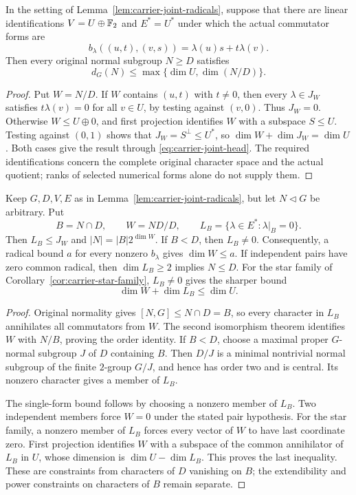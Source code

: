 \begin{corollary}\label{cor:carrier-star-family}
In the setting of Lemma~\ref{lem:carrier-joint-radicals}, suppose that
there are linear identifications $V=U\oplus\mathbb F_2$ and $E^*=U^*$ under
which the actual commutator forms are
\[
 b_\lambda((u,t),(v,s))=\lambda(u)s+t\lambda(v).
\]
Then every original normal subgroup $N\geq D$ satisfies
\[
 d_G(N)\leq\max\{\dim U,\dim(N/D)\}.
\]
\end{corollary}
\begin{proof}
Put $W=N/D$. If $W$ contains $(u,t)$ with $t\ne0$, then every
$\lambda\in J_W$ satisfies $t\lambda(v)=0$ for all $v\in U$, by
testing against $(v,0)$. Thus $J_W=0$.
Otherwise $W\leq U\oplus0$, and first projection identifies $W$
with a subspace $S\leq U$. Testing against $(0,1)$ shows that
$J_W=S^\perp\leq U^*$, so $\dim W+\dim J_W=\dim U$.
Both cases give the result through \eqref{eq:carrier-joint-head}.
The required identifications concern the complete original character
space and the actual quotient; ranks of selected numerical forms
alone do not supply them.
\end{proof}

\begin{lemma}\label{lem:carrier-intersection-directions}
Keep $G,D,V,E$ as in Lemma~\ref{lem:carrier-joint-radicals}, but let
$N\lhd G$ be arbitrary. Put
\[
 B=N\cap D,\qquad W=ND/D,\qquad
 L_B=\{\lambda\in E^*: \lambda|_B=0\}.
\]
Then $L_B\leq J_W$ and $|N|=|B|2^{\dim W}$.
If $B<D$, then $L_B\ne0$. Consequently, a radical bound $a$ for
every nonzero $b_\lambda$ gives $\dim W\leq a$.
If independent pairs have zero common radical, then
$\dim L_B\geq2$ implies $N\leq D$.
For the star family of Corollary~\ref{cor:carrier-star-family},
$L_B\ne0$ gives the sharper bound
\[
 \dim W+\dim L_B\leq\dim U.
\]
\end{lemma}
\begin{proof}
Original normality gives $[N,G]\leq N\cap D=B$, so every character
in $L_B$ annihilates all commutators from $W$. The second isomorphism
theorem identifies $W$ with $N/B$, proving the order identity.
If $B<D$, choose a maximal proper $G$-normal subgroup $J$ of $D$
containing $B$. Then $D/J$ is a minimal nontrivial normal subgroup
of the finite $2$-group $G/J$, and hence has order two and is
central. Its nonzero character gives a member of $L_B$.

The single-form bound follows by choosing a nonzero member of $L_B$.
Two independent members force $W=0$ under the stated pair hypothesis.
For the star family, a nonzero member of $L_B$ forces every vector
of $W$ to have last coordinate zero. First projection identifies $W$
with a subspace of the common annihilator of $L_B$ in $U$, whose
dimension is $\dim U-\dim L_B$. This proves the last inequality.
These are constraints from characters of $D$ vanishing on $B$;
the extendibility and power constraints on characters of $B$ remain
separate.
\end{proof}

